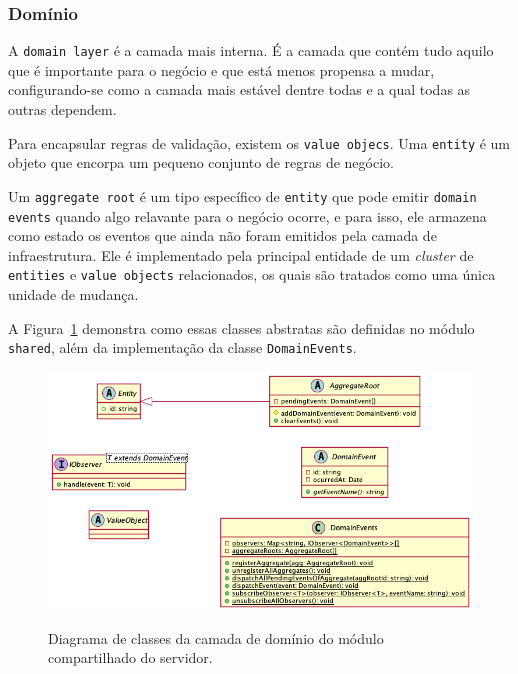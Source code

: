 \subsubsection{Domínio}

A \texttt{domain layer} é a camada mais interna. É a camada que contém tudo aquilo que é importante para o negócio e que está menos propensa a mudar, configurando-se como a camada mais estável dentre todas e a qual todas as outras dependem.

Para encapsular regras de validação, existem os \texttt{value objecs}. Uma \texttt{entity} é um objeto que encorpa um pequeno conjunto de regras de negócio.

Um \texttt{aggregate root} é um tipo específico de \texttt{entity} que pode emitir \texttt{domain events} quando algo relavante para o negócio ocorre, e para isso, ele armazena como estado os eventos que ainda não foram emitidos pela camada de infraestrutura. Ele é implementado pela principal entidade de um \emph{cluster} de \texttt{entities} e \texttt{value objects} relacionados, os quais são tratados como uma única unidade de mudança.

A Figura~\ref{f.system_server_shared-module_domain} demonstra como essas classes abstratas são definidas no módulo \texttt{shared}, além da implementação da classe \texttt{DomainEvents}.

\begin{figure}[htbp]
	\caption{\small Diagrama de classes da camada de domínio do módulo compartilhado do servidor.}
	\centering
	\includegraphics[width=\textwidth]{../diagrams/out/system_server_shared-module_domain.png}
	\label{f.system_server_shared-module_domain}
\end{figure}

\FloatBarrier

